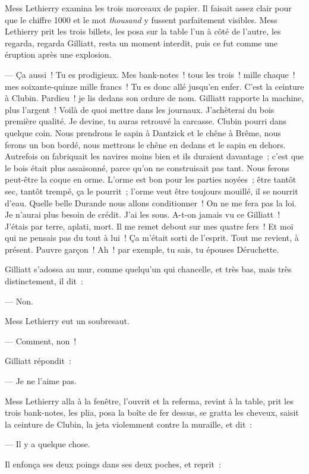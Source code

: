 \documentclass[french,twoside]{book} %
\begin{document}
Mess Lethierry examina les trois morceaux de papier. Il faisait assez clair pour que le chiffre 1000 et le mot \emph{thousand} y fussent parfaitement visibles. Mess Lethierry prit les trois billets, les posa sur la table l’un à côté de l’autre, les regarda, regarda Gilliatt, resta un moment interdit, puis ce fut comme une éruption après une explosion.\par
— Ça aussi ! Tu es prodigieux. Mes bank-notes ! tous les trois ! mille chaque ! mes soixante-quinze mille francs ! Tu es donc allé jusqu’en enfer. C’est la ceinture à Clubin. Pardieu ! je lis dedans son ordure de nom. Gilliatt rapporte la machine, plus l’argent ! Voilà de quoi mettre dans les journaux. J’achèterai du bois première qualité. Je devine, tu auras retrouvé la carcasse. Clubin pourri dans quelque coin. Nous prendrons le sapin à Dantzick et le chêne à Brême, nous ferons un  bon bordé, nous mettrons le chêne en dedans et le sapin en dehors. Autrefois on fabriquait les navires moins bien et ils duraient davantage ; c’est que le bois était plus assaisonné, parce qu’on ne construisait pas tant. Nous ferons peut-être la coque en orme. L’orme est bon pour les parties noyées ; être tantôt sec, tantôt trempé, ça le pourrit ; l’orme veut être toujours mouillé, il se nourrit d’eau. Quelle belle Durande nous allons conditionner ! On ne me fera pas la loi. Je n’aurai plus besoin de crédit. J’ai les sous. A-t-on jamais vu ce Gilliatt ! J’étais par terre, aplati, mort. Il me remet debout sur mes quatre fers ! Et moi qui ne pensais pas du tout à lui ! Ça m’était sorti de l’esprit. Tout me revient, à présent. Pauvre garçon ! Ah ! par exemple, tu sais, tu épouses Déruchette.\par
Gilliatt s’adossa au mur, comme quelqu’un qui chancelle, et très bas, mais très distinctement, il dit :\par
— Non.\par
Mess Lethierry eut un soubresaut.\par
— Comment, non !\par
Gilliatt répondit :\par
— Je ne l’aime pas.\par
Mess Lethierry alla à la fenêtre, l’ouvrit et la referma, revint à la table, prit les trois bank-notes, les plia, posa la boîte de fer dessus, se gratta les cheveux, saisit la ceinture de Clubin, la jeta violemment contre la muraille, et dit :\par
— Il y a quelque chose.\par
Il enfonça ses deux poings dans ses deux poches, et reprit :\par
\end{document}
